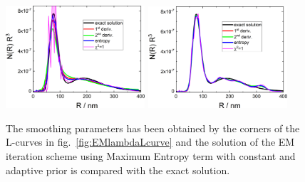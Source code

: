 \begin{figure}[htb]
\centering
\includegraphics[width=0.46\textwidth]{../images/form_factor/EM/EMconstNRR3.png}
\includegraphics[width=0.46\textwidth]{../images/form_factor/EM/EMadaptiveNRR3.png}
\caption{The smoothing parameters has been obtained by the corners of the L-curves in fig.\ \ref{fig:EMlambdaLcurve} and the solution of the EM iteration scheme using Maximum Entropy term with constant and adaptive prior is compared with the exact solution.\label{fig:EMconstadaptiveNRR3}}
\end{figure}


\clearpage
